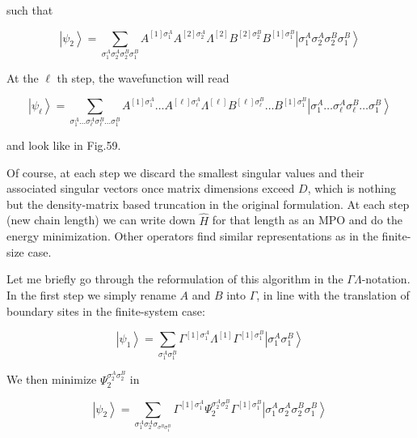 \documentclass[12pt]{article}
\begin{document}
such that


\begin{equation*}
\left|\psi_{2}\right\rangle=\sum_{\sigma_{1}^{A} \sigma_{2}^{A} \sigma_{2}^{B} \sigma_{1}^{B}} A^{[1] \sigma_{1}^{A}} A^{[2] \sigma_{2}^{A}} \Lambda^{[2]} B^{[2] \sigma_{2}^{B}} B^{[1] \sigma_{1}^{B}}\left|\sigma_{1}^{A} \sigma_{2}^{A} \sigma_{2}^{B} \sigma_{1}^{B}\right\rangle \tag{327}
\end{equation*}


At the $\ell$ th step, the wavefunction will read


\begin{equation*}
\left|\psi_{\ell}\right\rangle=\sum_{\sigma_{1}^{A} \ldots \sigma_{\ell}^{A} \sigma_{\ell}^{B} \ldots \sigma_{1}^{B}} A^{[1] \sigma_{1}^{A}} \ldots A^{[\ell] \sigma_{\ell}^{A}} \Lambda^{[\ell]} B^{[\ell] \sigma_{\ell}^{B}} \ldots B^{[1] \sigma_{1}^{B}}\left|\sigma_{1}^{A} \ldots \sigma_{\ell}^{A} \sigma_{\ell}^{B} \ldots \sigma_{1}^{B}\right\rangle \tag{328}
\end{equation*}


and look like in Fig.59.

Of course, at each step we discard the smallest singular values and their associated singular vectors once matrix dimensions exceed $D$, which is nothing but the density-matrix based truncation in the original formulation. At each step (new chain length) we can write down $\hat{H}$ for that length as an MPO and do the energy minimization. Other operators find similar representations as in the finite-size case.

Let me briefly go through the reformulation of this algorithm in the $\Gamma \Lambda$-notation. In the first step we simply rename $A$ and $B$ into $\Gamma$, in line with the translation of boundary sites in the finite-system case:


\begin{equation*}
\left|\psi_{1}\right\rangle=\sum_{\sigma_{1}^{A} \sigma_{1}^{B}} \Gamma^{[1] \sigma_{1}^{A}} \Lambda^{[1]} \Gamma^{[1] \sigma_{1}^{B}}\left|\sigma_{1}^{A} \sigma_{1}^{B}\right\rangle \tag{329}
\end{equation*}


We then minimize $\Psi_{2}^{\sigma_{2}^{A} \sigma_{2}^{B}}$ in


\begin{equation*}
\left|\psi_{2}\right\rangle=\sum_{\sigma_{1}^{A} \sigma_{2}^{A} \sigma_{\sigma^{B} \sigma_{1}^{B}}} \Gamma^{[1] \sigma_{1}^{A}} \Psi_{2}^{\sigma_{2}^{A} \sigma_{2}^{B}} \Gamma^{[1] \sigma_{1}^{B}}\left|\sigma_{1}^{A} \sigma_{2}^{A} \sigma_{2}^{B} \sigma_{1}^{B}\right\rangle \tag{330}
\end{equation*}
\end{document}
